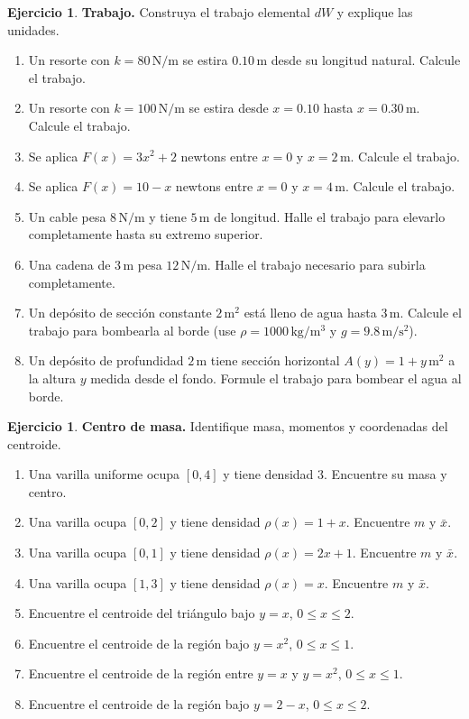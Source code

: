 \documentclass[12pt]{article}
\theoremstyle{definition}
\newtheorem{Ejer}[teorema]{Ejercicio}
\theoremstyle{remark}
\begin{document}
\begin{Ejer}\textbf{Trabajo.} Construya el trabajo elemental $dW$ y explique las unidades.
\begin{enumerate}[resume=banco3]
\item Un resorte con $k=80\,\mathrm{N/m}$ se estira $0.10\,\mathrm m$ desde su longitud natural. Calcule el trabajo.
\item Un resorte con $k=100\,\mathrm{N/m}$ se estira desde $x=0.10$ hasta $x=0.30\,\mathrm m$. Calcule el trabajo.
\item Se aplica $F(x)=3x^2+2$ newtons entre $x=0$ y $x=2\,\mathrm m$. Calcule el trabajo.
\item Se aplica $F(x)=10-x$ newtons entre $x=0$ y $x=4\,\mathrm m$. Calcule el trabajo.
\item Un cable pesa $8\,\mathrm{N/m}$ y tiene $5\,\mathrm m$ de longitud. Halle el trabajo para elevarlo completamente hasta su extremo superior.
\item Una cadena de $3\,\mathrm m$ pesa $12\,\mathrm{N/m}$. Halle el trabajo necesario para subirla completamente.
\item Un depósito de sección constante $2\,\mathrm{m}^2$ está lleno de agua hasta $3\,\mathrm m$. Calcule el trabajo para bombearla al borde (use $\rho=1000\,\mathrm{kg/m^3}$ y $g=9.8\,\mathrm{m/s^2}$).
\item Un depósito de profundidad $2\,\mathrm m$ tiene sección horizontal $A(y)=1+y\,\mathrm{m}^2$ a la altura $y$ medida desde el fondo. Formule el trabajo para bombear el agua al borde.
\end{enumerate}
\end{Ejer}

\begin{Ejer}\textbf{Centro de masa.} Identifique masa, momentos y coordenadas del centroide.
\begin{enumerate}[resume=banco3]
\item Una varilla uniforme ocupa $[0,4]$ y tiene densidad $3$. Encuentre su masa y centro.
\item Una varilla ocupa $[0,2]$ y tiene densidad $\rho(x)=1+x$. Encuentre $m$ y $\bar x$.
\item Una varilla ocupa $[0,1]$ y tiene densidad $\rho(x)=2x+1$. Encuentre $m$ y $\bar x$.
\item Una varilla ocupa $[1,3]$ y tiene densidad $\rho(x)=x$. Encuentre $m$ y $\bar x$.
\item Encuentre el centroide del triángulo bajo $y=x$, $0\le x\le2$.
\item Encuentre el centroide de la región bajo $y=x^2$, $0\le x\le1$.
\item Encuentre el centroide de la región entre $y=x$ y $y=x^2$, $0\le x\le1$.
\item Encuentre el centroide de la región bajo $y=2-x$, $0\le x\le2$.
\end{enumerate}
\end{Ejer}
\end{document}
